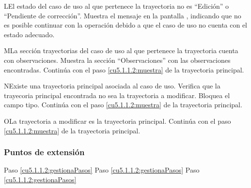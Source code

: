  \begin{UCtrayectoriaA}{L}{El estado del caso de uso al que pertenece la trayectoria no es ``Edición'' o ``Pendiente de corrección''.}
    \UCpaso[\UCsist] Muestra el mensaje  en la pantalla , indicando que no es posible
	continuar con la operación debido a que el caso de uso no cuenta con el estado adecuado.
 \end{UCtrayectoriaA}
 \begin{UCtrayectoriaA}{M}{La sección trayectorias del caso de uso al que pertenece la trayectoria cuenta con observaciones.}
    \UCpaso[\UCsist] Muestra la sección ``Observaciones'' con las observaciones encontradas.
	\UCpaso[] Continúa con el paso \ref{cu5.1.1.2:muestra} de la trayectoria principal.
 \end{UCtrayectoriaA}
 \begin{UCtrayectoriaA}{N}{Existe una trayectoria principal asociada al caso de uso.}
    \UCpaso[\UCsist] Verifica que la trayecoria principal encontrada no sea la trayectoria a modificar. 
	\UCpaso[\UCsist] Bloquea el campo tipo.	
	\UCpaso[] Continúa con el paso \ref{cu5.1.1.2:muestra} de la trayectoria principal.
 \end{UCtrayectoriaA}
 \begin{UCtrayectoriaA}{O}{La trayectoria a modificar es la trayectoria principal.}
	\UCpaso[] Continúa con el paso \ref{cu5.1.1.2:muestra} de la trayectoria principal.
 \end{UCtrayectoriaA}

\subsubsection{Puntos de extensión}

	{Paso \ref{cu5.1.1.2:gestionaPasos}}
	{}
	{Paso \ref{cu5.1.1.2:gestionaPasos}}
	{}	
	{Paso \ref{cu5.1.1.2:gestionaPasos}}
	{}
  